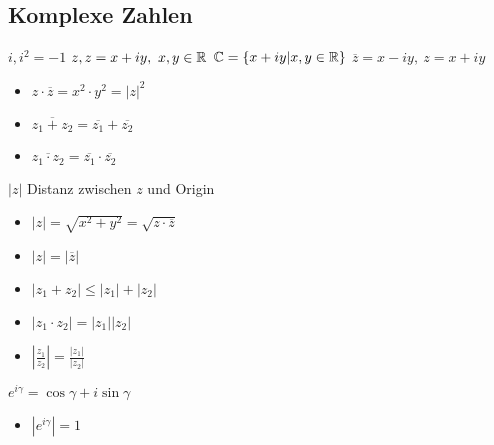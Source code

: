 \subsection{Komplexe Zahlen}
\begin{itemize}
     $i, i^2 = -1$
     $z, z = x + iy, \ x, y \in \mathbb{R}$
     $\mathbb{C} = \{x + iy | x,y \in \mathbb{R}\}$
     $\overline{z} = x - iy, \ z = x + iy$
        \begin{itemize}
            \item $z \cdot \overline{z} = x^2 \cdot y^2 = |z|^2$
            \item $\overline{z_1 + z_2} = \overline{z_1} + \overline{z_2}$
            \item $\overline{z_1 \cdot z_2} = \overline{z_1} \cdot \overline{z_2}$
        \end{itemize}
     $|z|$ Distanz zwischen $z$ und Origin
        \begin{itemize}
            \item $|z| = \sqrt{x^2 + y^2} = \sqrt{z \cdot \overline{z}} $
            \item $|z| = |\overline{z}|$
            \item $|z_1 + z_2| \le |z_1| + |z_2|$
            \item $|z_1 \cdot z_2| = |z_1||z_2|$
            \item $|\frac{z_1}{z_2}| = \frac{|z_1|}{|z_2|}$
        \end{itemize}
     $e^{i\gamma} = \cos \gamma + i \sin \gamma$
        \begin{itemize}
            \item $|e^{i \gamma}| = 1$
        \end{itemize}
\end{itemize}

